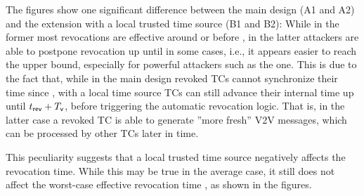 The figures show one significant difference between the main design (A1 and A2)
and the extension with a local trusted time source (B1 and B2): While in the
former most revocations are effective around or before \paramtt{}, in the latter
attackers are able to postpone revocation up until \paramteff{} in some cases,
i.e., it appears easier to reach the upper bound, especially for powerful
attackers such as the \attackersmart{} one. This is due to the fact that, while
in the main design revoked \acp{TC} cannot synchronize their time since
\paramtrev, with a local time source \acp{TC} can still advance their internal
time up until $\emph{$t_{\mathsf{rev}}$} + \emph{$T_{\mathsf{v}}$}$, before triggering the automatic
revocation logic. That is, in the latter case a revoked \ac{TC} is able to
generate ''more fresh'' \ac{V2V} messages, which can be processed by other
\acp{TC} later in time.

This peculiarity suggests that a local trusted time source negatively affects
the revocation time. While this may be true in the average case, it still does
not affect the worst-case effective revocation time \paramteff, as shown in the
figures.